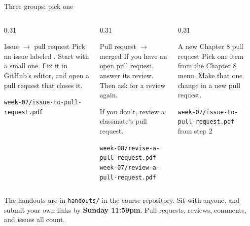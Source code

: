 \documentclass[9pt,aspectratio=169]{beamer}
\begin{document}
\begin{frame}{Three groups: pick one}
    \begin{columns}[T]
        \begin{column}{0.31\textwidth}
            \begin{block}{Issue $\to$ pull request}
                \small Pick an issue labeled . Start with a small one. Fix it in GitHub's editor, and open a pull request that closes it.

                \medskip
                \footnotesize \texttt{week-07/issue-to-pull-request.pdf}
            \end{block}
        \end{column}
        \begin{column}{0.31\textwidth}
            \begin{block}{Pull request $\to$ merged}
                \small If you have an open pull request, answer its review. Then ask for a review again.

                \smallskip
                If you don't, review a classmate's pull request.

                \medskip
                \footnotesize \texttt{week-08/revise-a-pull-request.pdf}\\
                \texttt{week-07/review-a-pull-request.pdf}
            \end{block}
        \end{column}
        \begin{column}{0.31\textwidth}
            \begin{block}{A new Chapter 8 pull request}
                \small Pick one item from the Chapter 8 menu. Make that one change in a new pull request.

                \medskip
                \footnotesize \texttt{week-07/issue-to-pull-request.pdf}\\from step 2
            \end{block}
        \end{column}
    \end{columns}

    \bigskip

    The handouts are in \texttt{handouts/} in the course repository. Sit with anyone, and submit your own links by \textbf{Sunday 11:59pm}. Pull requests, reviews, comments, and issues all count.
\end{frame}
\end{document}
